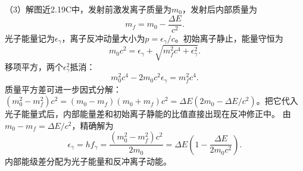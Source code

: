 \documentclass[UTF8,fontset=fandol,a4paper,11pt]{ctexart}
\begin{document}
（3）解图近2.19C中，发射前激发离子质量为$m_0$，发射后内部质量为
\[
m_f=m_0-\frac{\Delta E}{c^2}.
\]
光子能量记为$\epsilon_\gamma$，离子反冲动量大小为$p=\epsilon_\gamma/c$。初始离子静止，能量守恒为
\[
m_0c^2=\epsilon_\gamma+
\sqrt{m_f^2c^4+\epsilon_\gamma^2}.
\]
移项平方，两个$\epsilon_\gamma^2$抵消：
\[
m_0^2c^4-2m_0c^2\epsilon_\gamma=m_f^2c^4.
\]
质量平方差可进一步因式分解：$(m_0^2-m_f^2)c^2=(m_0-m_f)(m_0+m_f)c^2=\Delta E(2m_0-\Delta E/c^2)$。把它代入光子能量式后，内部能量差和初始离子静能的比值直接出现在反冲修正中。
由$m_0-m_f=\Delta E/c^2$，精确解为
\[
\boxed{\epsilon_\gamma=hf_\gamma
=\frac{(m_0^2-m_f^2)c^2}{2m_0}
=\Delta E\left(1-\frac{\Delta E}{2m_0c^2}\right)}.
\]
内部能级差分配为光子能量和反冲离子动能。

\begin{center}\begin{minipage}{.98\linewidth}\centering
\begin{tikzpicture}[scale=.82,transform shape]

\end{tikzpicture}
\end{minipage}
\end{center}
\end{document}
